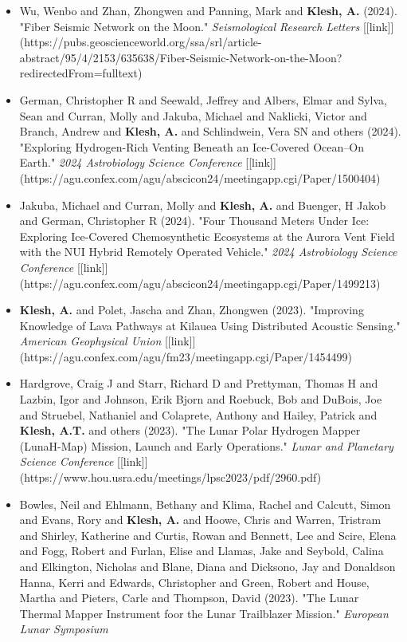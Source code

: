 \documentclass[11pt,letterpaper]{article}
\begin{document}
\begin{itemize}
\item Wu, Wenbo and Zhan, Zhongwen and Panning, Mark and \textbf{Klesh, A.} (2024). "Fiber Seismic Network on the Moon." \textit{Seismological Research Letters} [[link]](https://pubs.geoscienceworld.org/ssa/srl/article-abstract/95/4/2153/635638/Fiber-Seismic-Network-on-the-Moon?redirectedFrom=fulltext)
\item German, Christopher R and Seewald, Jeffrey and Albers, Elmar and Sylva, Sean and Curran, Molly and Jakuba, Michael and Naklicki, Victor and Branch, Andrew and \textbf{Klesh, A.} and Schlindwein, Vera SN and others (2024). "Exploring Hydrogen-Rich Venting Beneath an Ice-Covered Ocean--On Earth." \textit{2024 Astrobiology Science Conference} [[link]](https://agu.confex.com/agu/abscicon24/meetingapp.cgi/Paper/1500404)
\item Jakuba, Michael and Curran, Molly and \textbf{Klesh, A.} and Buenger, H Jakob and German, Christopher R (2024). "Four Thousand Meters Under Ice: Exploring Ice-Covered Chemosynthetic Ecosystems at the Aurora Vent Field with the NUI Hybrid Remotely Operated Vehicle." \textit{2024 Astrobiology Science Conference} [[link]](https://agu.confex.com/agu/abscicon24/meetingapp.cgi/Paper/1499213)
\item \textbf{Klesh, A.} and Polet, Jascha and Zhan, Zhongwen (2023). "Improving Knowledge of Lava Pathways at Kilauea Using Distributed Acoustic Sensing." \textit{American Geophysical Union} [[link]](https://agu.confex.com/agu/fm23/meetingapp.cgi/Paper/1454499)
\item Hardgrove, Craig J and Starr, Richard D and Prettyman, Thomas H and Lazbin, Igor and Johnson, Erik Bjorn and Roebuck, Bob and DuBois, Joe and Struebel, Nathaniel and Colaprete, Anthony and Hailey, Patrick and \textbf{Klesh, A.T.} and others (2023). "The Lunar Polar Hydrogen Mapper (LunaH-Map) Mission, Launch and Early Operations." \textit{Lunar and Planetary Science Conference} [[link]](https://www.hou.usra.edu/meetings/lpsc2023/pdf/2960.pdf)
\item Bowles, Neil and Ehlmann, Bethany and Klima, Rachel and Calcutt, Simon and Evans, Rory and \textbf{Klesh, A.} and Hoowe, Chris and Warren, Tristram and Shirley, Katherine and Curtis, Rowan and Bennett, Lee and Scire, Elena and Fogg, Robert and Furlan, Elise and Llamas, Jake and Seybold, Calina and Elkington, Nicholas and Blane, Diana and Dicksono, Jay and Donaldson Hanna, Kerri and Edwards, Christopher and Green, Robert and House, Martha and Pieters, Carle and Thompson, David (2023). "The Lunar Thermal Mapper Instrument foor the Lunar Trailblazer Mission." \textit{European Lunar Symposium}

\end{itemize}
\end{document}
